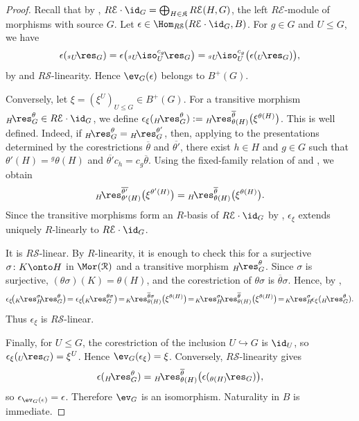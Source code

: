 \documentclass{amsart}
\numberwithin{equation}{section}%
\theoremstyle{remark}
\theoremstyle{definition}
\newcommand{\e}{\mathcal E}
\newcommand{\s}{\mathcal S}
\newcommand{\lres}[1]{{}_{#1}\!\res}
\newcommand{\liso}[1]{{}_{#1}\!\iso}
\newcommand{\ol}[1]{\overline{#1}}
\begin{document}
\begin{proof}
Recall that by ,
$R\e\cdot\id_G=\bigoplus_{H\in\mathfrak K}R\e(H,G)$,
the left $R\e$-module of morphisms with source $G$.
Let
$\epsilon\in\Hom_{R\s}(R\e\cdot\id_G,B)$.
For $g\in G$ and $U\leq G$, we have
%
\[
\epsilon(\lres{^gU}_G)
=
\epsilon\bigl(
\liso{^gU}_U^{c_g}\lres{}_G
\bigr)
=
\liso{^gU}_U^{c_g}
\bigl(\epsilon(\lres{U}_G)\bigr),
\]
%
by  and $R\s$-linearity.
Hence $\ev_G(\epsilon)$ belongs to $B^+(G)$.

Conversely, let
$\xi=(\xi^U)_{U\leq G}\in B^+(G)$.
For a transitive morphism
$\lres{H}_G^\theta\in R\e\cdot\id_G$, we define
$\epsilon_\xi(\lres{H}_G^\theta)
:=
\lres{H}_{\theta(H)}^{\ol{\theta}}
\bigl(\xi^{\theta(H)}\bigr)$.
This is well defined. Indeed, if
$\lres{H}_G^\theta=\lres{H}_G^{\theta'}$, then, applying
 to the presentations
determined by the corestrictions $\ol{\theta}$ and
$\ol{\theta'}$, there exist $h\in H$ and $g\in G$ such that
$\theta'(H)={}^g\theta(H)$ and
$\ol{\theta'}c_h=c_g\ol{\theta}$.
Using the fixed-family relation of
 and
, we obtain
%
\[
{}\lres{H}_{\theta'(H)}^{\ol{\theta'}}
\bigl(\xi^{\theta'(H)}\bigr)
=
\lres{H}_{\theta(H)}^{\ol{\theta}}
\bigl(\xi^{\theta(H)}\bigr).
\]
%
Since the transitive morphisms form an $R$-basis of
$R\e\cdot\id_G$ by ,
$\epsilon_\xi$ extends uniquely $R$-linearly to
$R\e\cdot\id_G$.


It is $R\s$-linear. By $R$-linearity, it is enough to check this
for a surjective $\sigma\colon K\onto H$ in $\Mor(\mathcal R)$ and a
transitive morphism $\lres{H}_G^\theta$. Since $\sigma$ is surjective,
$(\theta\sigma)(K)=\theta(H)$, and the corestriction of
$\theta\sigma$ is $\ol{\theta}\sigma$. Hence, by
,
%
\[
\epsilon_\xi\!
\bigl(
\lres{K}_H^\sigma\!\lres{}_G^\theta
\bigr)\!
=
\epsilon_\xi\!
\bigl(
\lres{K}_G^{\theta\sigma}
\bigr) \!
=\!
\lres{K}_{\theta(H)}^{\ol{\theta}\sigma}
\bigl(\xi^{\theta(H)}\bigr) \!
=\!
\lres{K}_H^\sigma\!
\lres{}_{\theta(H)}^{\ol{\theta}}
\bigl(\xi^{\theta(H)}\bigr)\!
=\!
\lres{K}_H^\sigma\!
\epsilon_\xi(\lres{H}_G^\theta).
\]
%
Thus $\epsilon_\xi$ is $R\s$-linear.

Finally, for $U\leq G$, the corestriction of the inclusion
$U\hookrightarrow G$ is $\id_U$, so
$\epsilon_\xi(\lres{U}_G)=\xi^U$.
Hence $\ev_G(\epsilon_\xi)=\xi$.
Conversely, $R\s$-linearity gives
%
\[
\epsilon(\lres{H}_G^\theta)
=
\lres{H}_{\theta(H)}^{\ol{\theta}}
\bigl(\epsilon(\lres{\theta(H)}_G)\bigr),
\]
%
so $\epsilon_{\ev_G(\epsilon)}=\epsilon$.
Therefore $\ev_G$ is an isomorphism.
Naturality in $B$ is immediate. 
\end{proof}
\end{document}
